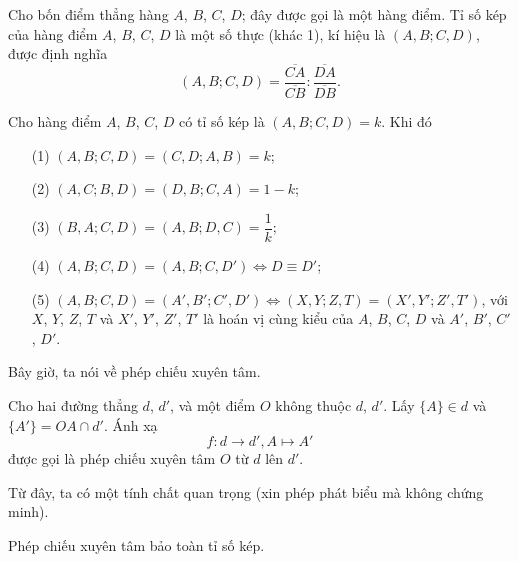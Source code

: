         \begin{definition}
            Cho bốn điểm thẳng hàng \(A\), \(B\), \(C\), \(D\); đây được gọi là một hàng điểm. Tỉ số kép của hàng điểm \(A\), \(B\), \(C\), \(D\) là một số thực (khác 1), kí hiệu là \((A,B;C,D)\), được định nghĩa
            \[(A,B;C,D) = \dfrac{\overline{CA}}{\overline{CB}} : \dfrac{\overline{DA}}{\overline{DB}}.\]
        \end{definition}

        \begin{property}
            Cho hàng điểm \(A\), \(B\), \(C\), \(D\) có tỉ số kép là \((A,B;C,D) = k\). Khi đó
            \begin{enumerate}
                \item[(1)] \((A,B;C,D) = (C,D;A,B) = k\);
                \item[(2)] \((A,C;B,D) = (D,B;C,A) = 1 - k\);
                \item[(3)] \((B,A;C,D) = (A,B;D,C) = \dfrac{1}{k}\);
                \item[(4)] \((A,B;C,D) = (A,B;C,D') \iff D \equiv D'\);
                \item[(5)] \((A,B;C,D) = (A',B';C',D') \iff (X,Y;Z,T) = (X',Y';Z',T')\), với \(X\), \(Y\), \(Z\), \(T\) và \(X'\), \(Y'\), \(Z'\), \(T'\) là hoán vị cùng kiểu của \(A\), \(B\), \(C\), \(D\) và \(A'\), \(B'\), \(C'\), \(D'\).
            \end{enumerate}
        \end{property}

        Bây giờ, ta nói về phép chiếu xuyên tâm.

        \begin{definition}
            Cho hai đường thẳng \(d\), \(d'\), và một điểm \(O\) không thuộc \(d\), \(d'\). Lấy \(\{A\} \in d\) và \(\{A'\} = OA \cap d'\). Ánh xạ
            \[f: d \to d', A \mapsto A'\]
            được gọi là phép chiếu xuyên tâm \(O\) từ \(d\) lên \(d'\).
        \end{definition}

        Từ đây, ta có một tính chất quan trọng (xin phép phát biểu mà không chứng minh).

        \begin{property}
            Phép chiếu xuyên tâm bảo toàn tỉ số kép.
        \end{property}

